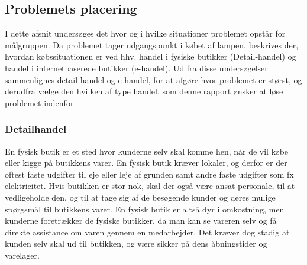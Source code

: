 \subsection{Problemets placering}
I dette afsnit undersøges det hvor og i hvilke situationer problemet opstår for målgruppen. Da problemet tager udgangspunkt i købet af lampen, beskrives der, hvordan købssituationen er ved hhv. handel i fysiske butikker (Detail-handel) og handel i internetbaserede butikker (e-handel). Ud fra disse undersøgelser sammenlignes detail-handel og e-handel, for at afgøre hvor problemet er størst, og derudfra vælge den hvilken af type handel, som denne rapport ønsker at løse problemet indenfor.

\subsubsection{Detailhandel}
En fysisk butik er et sted hvor kunderne selv skal komme hen, når de vil købe eller kigge på butikkens varer. En fysisk butik kræver lokaler, og derfor er der oftest faste udgifter til eje eller leje af grunden samt andre faste udgifter som fx elektricitet. Hvis butikken er stor nok, skal der også være ansat personale, til at vedligeholde den, og til at tage sig af de besøgende kunder og deres mulige spørgsmål til butikkens varer. En fysisk butik er altså dyr i omkostning, men kunderne foretrækker de fysiske butikker, da man kan se vareren selv og få direkte assistance om varen gennem en medarbejder. \cite{fysisk_kontra_online} Det kræver dog stadig at kunden selv skal ud til butikken, og være sikker på dens åbningstider og varelager.

